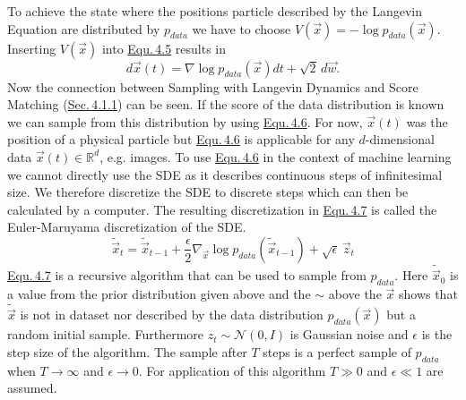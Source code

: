 To achieve the state where the positions particle described by the Langevin Equation are distributed by $p_{data}$ we have to choose $V(\vec{x})=-\log p_{data}({\vec{x}})$. Inserting $V(\vec{x})$ into \hyperref[equ:4.5]{Equ.\,4.5} results in
%
\begin{equation} \label{equ:4.6}
    d\vec{x}(t)=\nabla\log p_{data}(\vec{x})dt+\sqrt{2}\,d\vec{w}.
\end{equation}
%
Now the connection between Sampling with Langevin Dynamics and Score Matching (\hyperref[sec:4.1.1]{Sec.\,4.1.1}) can be seen. If the score of the data distribution is known we can sample from this distribution by using \hyperref[equ:4.6]{Equ.\,4.6}. For now, $\vec{x}(t)$ was the position of a physical particle but \hyperref[equ:4.6]{Equ.\,4.6} is applicable for any $d$-dimensional data $\vec{x}(t)\in\mathbb{R}^d$, e.g. images. To use \hyperref[equ:4.6]{Equ.\,4.6} in the context of machine learning we cannot directly use the SDE as it describes continuous steps of infinitesimal size. We therefore discretize the SDE to discrete steps which can then be calculated by a computer. The resulting discretization in \hyperref[equ:4.7]{Equ.\,4.7} is called the Euler-Maruyama discretization of the SDE.
%
\begin{equation} \label{equ:4.7}
    \tilde{\vec{x}}_t=\tilde{\vec{x}}_{t-1}+\frac{\epsilon}{2}\nabla_{\vec{x}}\log p_{data}(\tilde{\vec{x}}_{t-1})+\sqrt{\epsilon}\,\vec{z}_t
\end{equation}
%
\hyperref[equ:4.7]{Equ.\,4.7} is a recursive algorithm that can be used to sample from $p_{data}$. Here $\tilde{\vec{x}}_0$ is a value from the prior distribution given above and the $\sim$ above the $\vec{x}$ shows that $\tilde{\vec{x}}$ is not in dataset nor described by the data distribution $p_{data}(\vec{x})$ but a random initial sample. Furthermore $z_t\sim\mathcal{N}(0, I)$ is Gaussian noise and $\epsilon$ is the step size of the algorithm. The sample after $T$ steps is a perfect sample of $p_{data}$ when $T\rightarrow\infty$ and $\epsilon\rightarrow0$. For application of this algorithm $T\gg0$ and $\epsilon\ll1$ are assumed.

